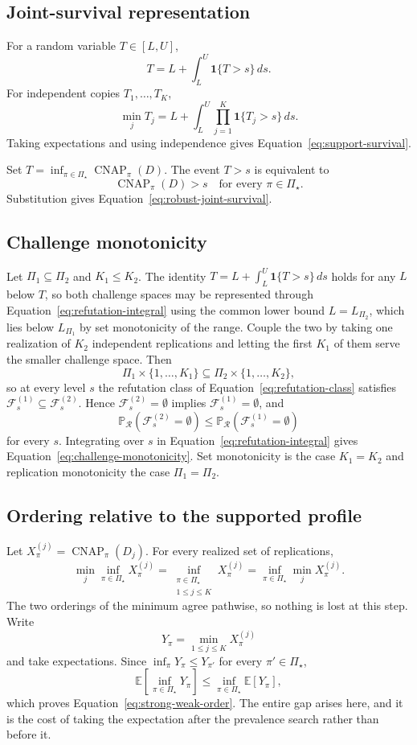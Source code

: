 \documentclass[11pt]{article}
\newcommand{\CNAP}{\operatorname{CNAP}}
\newcommand{\Regime}{\mathcal{R}}
\newcommand{\PSet}{\Pi_\star}
\newcommand{\E}{\mathbb{E}}
\newcommand{\Prb}{\mathbb{P}}
\newcommand{\RefSet}{\mathcal{F}}
\theoremstyle{remark}
\begin{document}
\subsection{Joint-survival representation}

For a random variable $T\in[L,U]$,
\[
T
=
L+\int_L^U\mathbf{1}\{T>s\}\,ds.
\]
For independent copies $T_1,\ldots,T_K$,
\[
\min_jT_j
=
L+
\int_L^U
\prod_{j=1}^{K}
\mathbf{1}\{T_j>s\}\,ds.
\]
Taking expectations and using independence gives Equation~\eqref{eq:support-survival}.

Set $T=\inf_{\pi\in\PSet}\CNAP_\pi(D)$. The event $T>s$ is equivalent to
\[
\CNAP_\pi(D)>s
\quad
\text{for every }\pi\in\PSet.
\]
Substitution gives Equation~\eqref{eq:robust-joint-survival}.

\subsection{Challenge monotonicity}

Let $\Pi_1\subseteq\Pi_2$ and $K_1\leq K_2$. The identity $T=L+\int_L^U\mathbf{1}\{T>s\}\,ds$ holds for any $L$ below $T$, so both challenge spaces may be represented through Equation~\eqref{eq:refutation-integral} using the common lower bound $L=L_{\Pi_2}$, which lies below $L_{\Pi_1}$ by set monotonicity of the range. Couple the two by taking one realization of $K_2$ independent replications and letting the first $K_1$ of them serve the smaller challenge space. Then
\[
\Pi_1\times\{1,\ldots,K_1\}
\subseteq
\Pi_2\times\{1,\ldots,K_2\},
\]
so at every level $s$ the refutation class of Equation~\eqref{eq:refutation-class} satisfies $\RefSet_s^{(1)}\subseteq\RefSet_s^{(2)}$. Hence $\RefSet_s^{(2)}=\emptyset$ implies $\RefSet_s^{(1)}=\emptyset$, and
\[
\Prb_{\Regime}\left(\RefSet_s^{(2)}=\emptyset\right)
\leq
\Prb_{\Regime}\left(\RefSet_s^{(1)}=\emptyset\right)
\]
for every $s$. Integrating over $s$ in Equation~\eqref{eq:refutation-integral} gives Equation~\eqref{eq:challenge-monotonicity}. Set monotonicity is the case $K_1=K_2$ and replication monotonicity the case $\Pi_1=\Pi_2$.

\subsection{Ordering relative to the supported profile}

Let $X_\pi^{(j)}=\CNAP_\pi(D_j)$. For every realized set of replications,
\[
\min_j\inf_{\pi\in\PSet}X_\pi^{(j)}
=
\inf_{\substack{\pi\in\PSet\\1\leq j\leq K}}
X_\pi^{(j)}
=
\inf_{\pi\in\PSet}\min_jX_\pi^{(j)}.
\]
The two orderings of the minimum agree pathwise, so nothing is lost at this step. Write
\[
Y_\pi=\min_{1\leq j\leq K}X_\pi^{(j)}
\]
and take expectations. Since $\inf_\pi Y_\pi\leq Y_{\pi'}$ for every $\pi'\in\PSet$,
\[
\E\left[\inf_{\pi\in\PSet}Y_\pi\right]
\leq
\inf_{\pi\in\PSet}\E[Y_\pi],
\]
which proves Equation~\eqref{eq:strong-weak-order}. The entire gap arises here, and it is the cost of taking the expectation after the prevalence search rather than before it.
\end{document}
